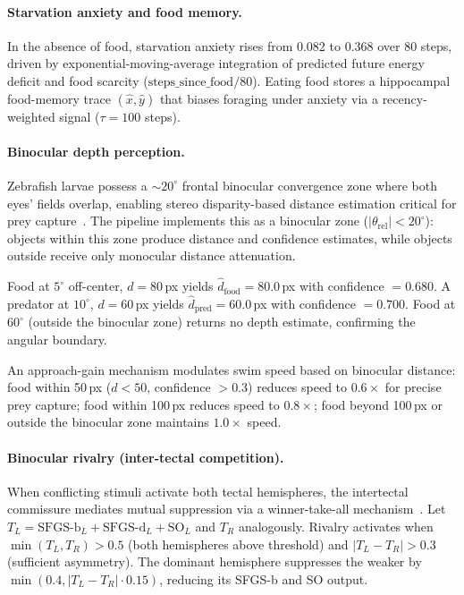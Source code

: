 \documentclass[11pt,a4paper]{article}
\begin{document}
\paragraph{Starvation anxiety and food memory.}
In the absence of food, starvation anxiety rises from 0.082 to 0.368
over 80 steps, driven by exponential-moving-average integration of
predicted future energy deficit and food scarcity
($\text{steps\_since\_food} / 80$). Eating food stores a hippocampal
food-memory trace $(\hat{x}, \hat{y})$ that biases foraging under anxiety
via a recency-weighted signal ($\tau = 100$ steps).

\paragraph{Binocular depth perception.}
Zebrafish larvae possess a $\sim\!20^\circ$ frontal binocular convergence zone
where both eyes' fields overlap, enabling stereo disparity-based distance
estimation critical for prey capture~\cite{bianco2011}.
The pipeline implements this as a binocular zone ($|{\theta_\text{rel}}| < 20^\circ$):
objects within this zone produce distance and confidence estimates, while objects
outside receive only monocular distance attenuation.

Food at $5^\circ$ off-center, $d = 80$\,px yields
$\hat{d}_\text{food} = 80.0$\,px with confidence $= 0.680$.
A predator at $10^\circ$, $d = 60$\,px yields
$\hat{d}_\text{pred} = 60.0$\,px with confidence $= 0.700$.
Food at $60^\circ$ (outside the binocular zone) returns no depth estimate,
confirming the angular boundary.

An approach-gain mechanism modulates swim speed based on binocular distance:
food within 50\,px ($d < 50$, confidence $> 0.3$) reduces speed to $0.6\times$
for precise prey capture; food within 100\,px reduces speed to $0.8\times$;
food beyond 100\,px or outside the binocular zone maintains $1.0\times$ speed.

\paragraph{Binocular rivalry (inter-tectal competition).}
When conflicting stimuli activate both tectal hemispheres, the intertectal
commissure mediates mutual suppression via a winner-take-all
mechanism~\cite{nikolaou2012}. Let $T_L = \text{SFGS-b}_L + \text{SFGS-d}_L +
\text{SO}_L$ and $T_R$ analogously. Rivalry activates when
$\min(T_L, T_R) > 0.5$ (both hemispheres above threshold) and
$|T_L - T_R| > 0.3$ (sufficient asymmetry). The dominant hemisphere
suppresses the weaker by $\min(0.4, |T_L - T_R| \cdot 0.15)$, reducing
its SFGS-b and SO output.
\end{document}
